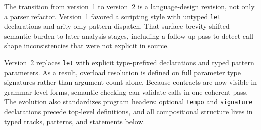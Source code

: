 The transition from version~1 to version~2 is a language-design revision, not only a parser refactor.
Version~1 favored a scripting style with untyped \texttt{let} declarations and arity-only pattern dispatch.
That surface brevity shifted semantic burden to later analysis stages, including a follow-up pass to detect call-shape
inconsistencies that were not explicit in source.

Version~2 replaces \texttt{let} with explicit type-prefixed declarations and typed pattern parameters.
As a result, overload resolution is defined on full parameter type signatures rather than argument count alone.
Because contracts are now visible in grammar-level forms, semantic checking can validate calls in one coherent pass.
The evolution also standardizes program headers: optional \texttt{tempo} and \texttt{signature} declarations precede
top-level definitions, and all compositional structure lives in typed tracks, patterns, and statements below.

